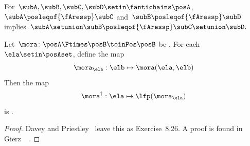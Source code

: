 \begin{lemma}
    \label{lem:antichain_union}
    For~$\subA,\subB,\subC,\subD\setin\fantichains\posA$,~$\subA\posleqof{\fAressp}\subC$
    and~$\subB\posleqof{\fAressp}\subD$ implies~$\subA\setunion \subB\posleqof{\fAressp}\subC\setunion \subD.
    $
\end{lemma}

\begin{lemma}
    \label{lem:dagger}
    Let~$\mora\colon\posA\Ptimes\posB\toinPos\posB$ be .
    For each~$\ela\setin\posAset$, define the map
    \begin{equation}
        \mora_{\ela}:\elb\mapsto \mora(\ela,\elb)
    \end{equation}
    Then the map
    \begin{equation}
        \mora^{\dagger}:\ela\mapsto\lfp(\mora_{\ela})
    \end{equation}
    is .
\end{lemma}
\begin{proof}
    Davey and Priestley~\cite{davey02} leave this as Exercise~8.26.
    A proof is found in Gierz~\etal~\cite[Exercise II-2.29]{gierz03continuous}.
\end{proof}

